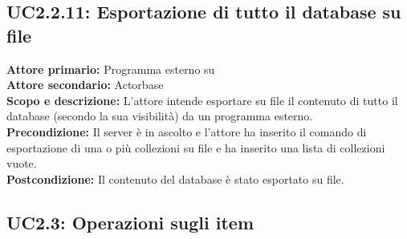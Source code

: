 \documentclass{scalatekids-article}
\begin{document}
\subsection{UC2.2.11: Esportazione di tutto il database su file}

\textbf{Attore primario:} Programma esterno su \\
\textbf{Attore secondario:} Actorbase\\
\textbf{Scopo e descrizione:} L'attore intende esportare su file il contenuto di tutto il database (secondo la sua visibilità) da un programma  esterno.\\ %
\textbf{Precondizione:} Il server è in ascolto e l'attore ha inserito il comando di esportazione di una o più collezioni su file e ha inserito una lista di collezioni vuote.\\
\textbf{Postcondizione:} Il contenuto del database è stato esportato su file.

\subsection{UC2.3: Operazioni sugli item}
\end{document}
